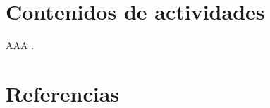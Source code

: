 \documentclass[12pt]{article}
\begin{document}

\section*{Contenidos de actividades}

AAA \cite{DQNCart}.


\newpage

\section*{Referencias}
\renewcommand\refname{}


\end{document}
